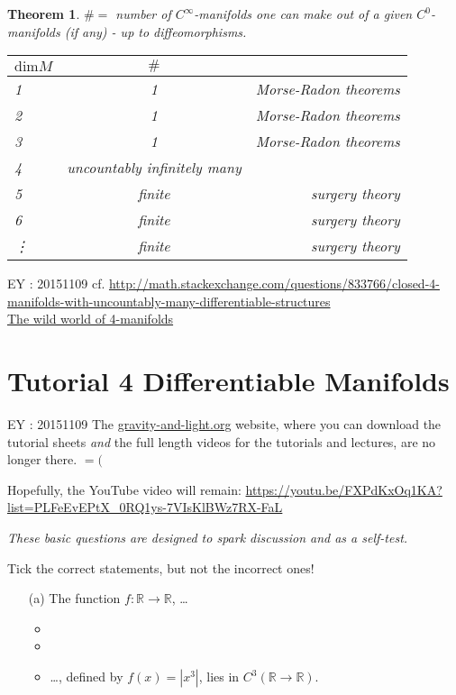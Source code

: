 \documentclass[10pt, twoside]{amsart}
\newtheorem{theorem}{Theorem}
\newcommand{\exercisehead}[1]
  { \smallskip
   \noindent{\small\bf Exercise #1.}
  }
\begin{document}
\begin{multicols*}{2}
\begin{theorem}
  $\# = $ number of $C^{\infty}$-manifolds one can make out of a given $C^0$-manifolds (if any) - up to diffeomorphisms.  

\begin{tabular}{l | c r }
  $\text{dim}M$ &  $\#$ &  \\
  \hline
  1  & 1  & Morse-Radon theorems \\
 2  & 1  & Morse-Radon theorems \\
 3 & 1  & Morse-Radon theorems \\
4 & uncountably infinitely many & \\
5 &   finite  & surgery theory \\
6 &  finite & surgery theory \\
\vdots & finite & surgery theory
\end{tabular}

\end{theorem}

EY : 20151109 cf. \url{http://math.stackexchange.com/questions/833766/closed-4-manifolds-with-uncountably-many-differentiable-structures}  \\
\href{http://www.maths.ed.ac.uk/~aar/papers/scorpan.pdf}{The wild world of 4-manifolds}


\section*{Tutorial 4 Differentiable Manifolds}

EY : 20151109 The \url{gravity-and-light.org} website, where you can download the tutorial sheets \emph{and} the full length videos for the tutorials and lectures, are no longer there.  $=($  

Hopefully, the YouTube video will remain: \url{https://youtu.be/FXPdKxOq1KA?list=PLFeEvEPtX_0RQ1ys-7VIsKlBWz7RX-FaL}

\exercisehead{1: True or false?} \emph{These basic questions are designed to spark discussion and as a self-test.}

Tick the correct statements, but not the incorrect ones!

\begin{enumerate}
  \item[(a)] The function $f: \mathbb{R} \to \mathbb{R}$, \dots
    \begin{itemize}
      \item  
      \item
      \item \dots , defined by $f(x) = |x^3|$, lies in $C^3(\mathbb{R} \to \mathbb{R})$.  


\end{itemize}
\end{enumerate}
\end{multicols*}
\end{document}
